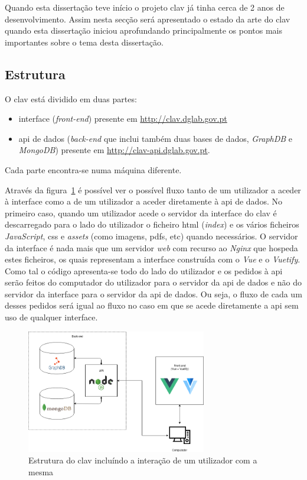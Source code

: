 Quando esta dissertação teve início o projeto \acrshort{clav} já tinha cerca de 2 anos de desenvolvimento. Assim nesta secção será apresentado o estado da arte do \acrshort{clav} quando esta dissertação iniciou aprofundando principalmente os pontos mais importantes sobre o tema desta dissertação.

\subsection{Estrutura}
O \acrshort{clav} está dividido em duas partes:
\begin{itemize}
    \item interface (\textit{front-end}) presente em \url{http://clav.dglab.gov.pt}
    \item \acrshort{api} de dados (\textit{back-end} que inclui também duas bases de dados, \textit{GraphDB} e \textit{MongoDB}) presente em \url{http://clav-api.dglab.gov.pt}.
\end{itemize}

Cada parte encontra-se numa máquina diferente.

Através da figura~\ref{fig:clav_struct} é possível ver o possível fluxo tanto de um utilizador a aceder à interface como a de um utilizador a aceder diretamente à \acrshort{api} de dados. No primeiro caso, quando um utilizador acede o servidor da interface do \acrshort{clav} é descarregado para o lado do utilizador o ficheiro \acrshort{html} (\textit{index}) e os vários ficheiros \textit{JavaScript}, \acrshort{css} e \textit{assets} (como imagens, \acrshort{pdf}s, etc) quando necessários. O servidor da interface é nada mais que um servidor \textit{web} com recurso ao \textit{Nginx} que hospeda estes ficheiros, os quais representam a interface construída com o \textit{Vue} e o \textit{Vuetify}. Como tal o código apresenta-se todo do lado do utilizador e os pedidos à \acrshort{api} serão feitos do computador do utilizador para o servidor da \acrshort{api} de dados e não do servidor da interface para o servidor da \acrshort{api} de dados. Ou seja, o fluxo de cada um desses pedidos será igual ao fluxo no caso em que se acede diretamente a \acrshort{api} sem uso de qualquer interface.

\begin{figure}[H]
    \begin{center}
        \includegraphics[width=0.7\textwidth]{img/clav_struct.png}
    \end{center}
    \caption{Estrutura do \acrshort{clav} incluíndo a interação de um utilizador com a mesma}\label{fig:clav_struct}
\end{figure}

